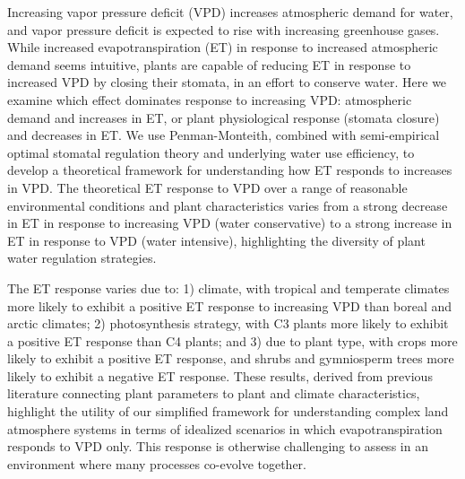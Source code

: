 Increasing vapor pressure deficit (VPD) increases atmospheric demand
for water, and vapor pressure deficit is expected to rise with
increasing greenhouse gases. While increased evapotranspiration (ET)
in response to increased atmospheric demand seems intuitive, plants
are capable of reducing ET in response to increased VPD by closing
their stomata, in an effort to conserve water. Here we examine which
effect dominates response to increasing VPD: atmospheric demand and
increases in ET, or plant physiological response (stomata closure) and
decreases in ET. We use Penman-Monteith, combined with semi-empirical
optimal stomatal regulation theory and underlying water use
efficiency, to develop a theoretical framework for understanding how
ET responds to increases in VPD. The theoretical ET response to VPD
over a range of reasonable environmental conditions and plant
characteristics varies from a strong decrease in ET in response to
increasing VPD (water conservative) to a strong increase in ET in
response to VPD (water intensive), highlighting the diversity of plant
water regulation strategies.

The ET response varies due to: 1) climate, with tropical and temperate
climates more likely to exhibit a positive ET response to increasing
VPD than boreal and arctic climates; 2) photosynthesis strategy, with
C3 plants more likely to exhibit a positive ET response than C4
plants; and 3) due to plant type, with crops more likely to exhibit a
positive ET response, and shrubs and gymniosperm trees more likely to
exhibit a negative ET response. These results, derived from previous
literature connecting plant parameters to plant and climate
characteristics, highlight the utility of our simplified framework for
understanding complex land atmosphere systems in terms of idealized
scenarios in which evapotranspiration responds to VPD only. This
response is otherwise challenging to assess in an environment where
many processes co-evolve together.